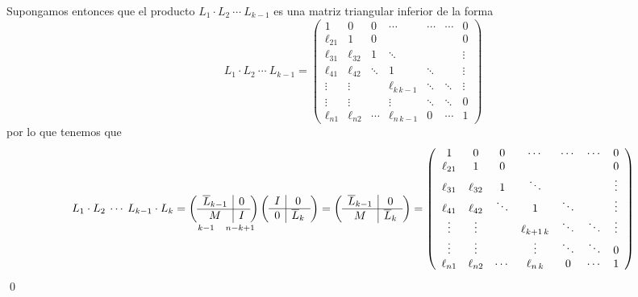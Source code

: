 \begin{met}
\begin{dem}
Supongamos entonces que el producto $L_1\cdot L_2 \: \cdots \: L_{k-1}$ es una matriz triangular inferior de la forma
$$L_1\cdot L_2 \: \cdots \: L_{k-1}=\left(\begin{array}{ccccccc}
   1  &0&0&\cdots&\cdots&\cdots&0  \\
    \ell_{21} & 1&0&&&&0\\
    \ell_{31} &\ell_{32}&1&\ddots&&&\vdots\\
    \ell_{41} &\ell_{42}&\ddots & 1 & \ddots &&\vdots\\
    \vdots &\vdots&&\ell_{k\,k-1}&\ddots &\ddots& \vdots\\
    \vdots &\vdots&&\vdots&\ddots & \ddots&0\\
    \ell_{n1}&\ell_{n2}&\cdots&\ell_{n\,k-1}&0&\cdots & 1
\end{array}\right)$$
por lo que tenemos que $$L_1\cdot L_2 \: \cdots \: L_{k-1} \cdot L_k
    =\underset{{\; \; k-1 \quad n-k+1}}{\left(\begin{array}{c | c}
        \overline{L}_{k-1} & 0 \\
        \hline M & I
    \end{array}\right)}
    \left(\begin{array}{c|c}
        I & 0 \\
        \hline 0 & \overline{L}_k
    \end{array}\right)=\left(\begin{array}{c|c}
        \overline{L}_{k-1} & 0 \\
        \hline M & \overline{L}_k 
    \end{array}\right)=
    \left(\begin{array}{ccccccc}
   1  &0&0&\cdots&\cdots&\cdots&0  \\
    \ell_{21} & 1&0&&&&0\\
    \ell_{31} &\ell_{32}&1&\ddots&&&\vdots\\
    \ell_{41} &\ell_{42}&\ddots & 1 & \ddots &&\vdots\\
    \vdots &\vdots&&\ell_{k+1\,k}&\ddots &\ddots& \vdots\\
    \vdots &\vdots&&\vdots&\ddots & \ddots&0\\
    \ell_{n1}&\ell_{n2}&\cdots&\ell_{n\,k}&0&\cdots & 1
\end{array}\right)$$
\qed\end{dem}
    \end{met}
